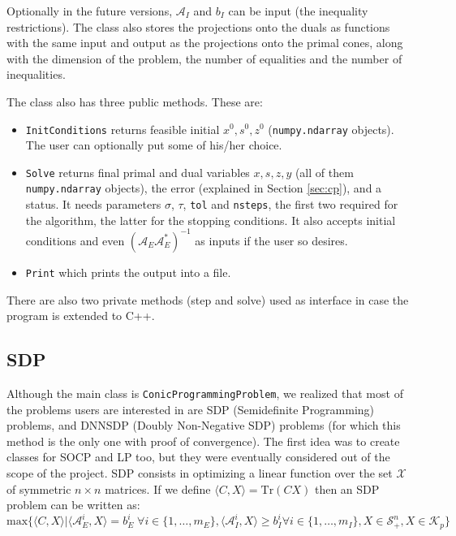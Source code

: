 \documentclass[paper=a4, fontsize=11pt]{scrartcl}
\numberwithin{equation}{section}		%
\numberwithin{figure}{section}			%
\numberwithin{table}{section}				%
\begin{document}
Optionally in the future versions, $\mathcal{A}_I$ and $b_I$ can be input (the inequality restrictions).
The class also stores the projections onto the duals as functions with the same input and output as the projections onto the primal cones, along with the dimension of the problem, the number of equalities and the number of inequalities.

The class also has three public methods. These are:
\begin{itemize}
\item \texttt{InitConditions} returns feasible initial $x^0,s^0,z^0$ (\texttt{numpy.ndarray} objects). The user can optionally put some of his/her choice.
\item \texttt{Solve} returns final primal and dual variables $x,s,z,y$ (all of them \texttt{numpy.ndarray} objects), the error (explained in Section \ref{sec:cp}), and a status. It needs parameters $\sigma$, $\tau$, \texttt{tol} and \texttt{nsteps}, the first two required for the algorithm, the latter for the stopping conditions. It also accepts initial conditions and even $(\mathcal{A}_E\mathcal{A}_E^*)^{-1}$ as inputs if the user so desires.
\item \texttt{Print} which prints the output into a file.
\end{itemize}

There are also two private methods (step and solve) used as interface in case the program is extended to C++.
\subsection{SDP}

Although the main class is \texttt{ConicProgrammingProblem}, we realized that most of the problems users are interested in are SDP (Semidefinite Programming) problems, and DNNSDP (Doubly Non-Negative SDP) problems (for which this method is the only one with proof of convergence). The first idea was to create classes for SOCP and LP too, but they were eventually considered out of the scope of the project. SDP consists in optimizing a linear function over the set $\mathcal{X}$ of symmetric $n\times n$ matrices. If we define $\langle C, X \rangle = \text{Tr}(CX)$ then an SDP problem can be written as:
\begin{equation}
\text{max}\{\langle C, X\rangle | \langle\mathcal{A}^i_E, X\rangle = b_E^i \; \forall i \in \{1,\dots,m_{E}\}, \langle\mathcal{A}^i_I,X\rangle\geq b_I^i \forall i \in \{1,\dots,m_I\}, X \in \mathcal{S}^n_+, X \in \mathcal{K}_p\}  
\end{equation}
\end{document}

